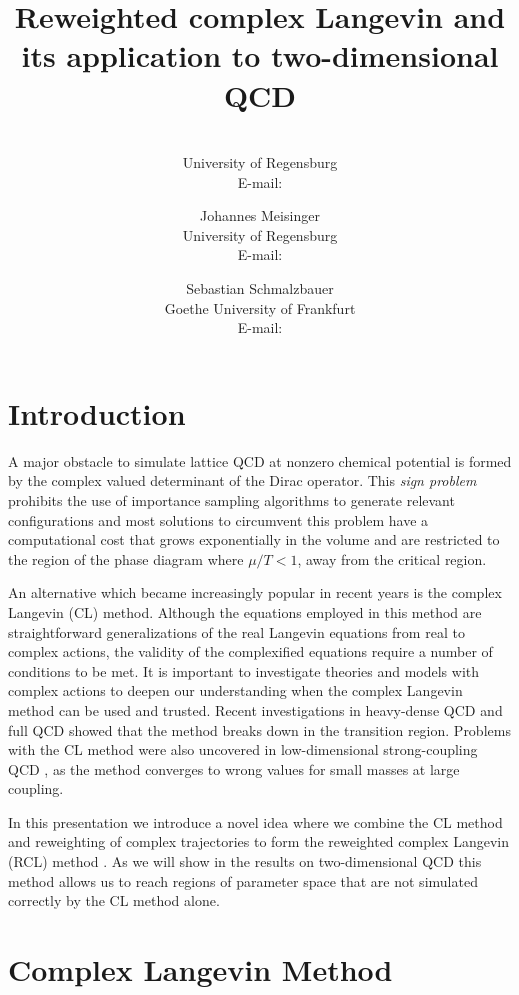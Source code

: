 \documentclass{PoS}
\title{Reweighted complex Langevin and its application to two-dimensional QCD}
\author{\speaker{Jacques Bloch}\\
        University of Regensburg\\
        E-mail: \email{jacques.bloch@ur.de}}
\author{Johannes Meisinger\\
        University of Regensburg\\
        E-mail: \email{johannes.meisinger@ur.de}}
\author{Sebastian Schmalzbauer\\
        Goethe University of Frankfurt \\
        E-mail: \email{schmalzbauer@th.physik.uni-frankfurt.de}}
\begin{document}
\section{Introduction}

A major obstacle to simulate lattice QCD at nonzero chemical potential is formed by the complex valued determinant of the Dirac operator. This \emph{sign problem} prohibits the use of importance sampling algorithms to generate relevant configurations and most solutions to circumvent this problem have a computational cost that grows exponentially in the volume and are restricted to the region of the phase diagram where $\mu/T<1$, away from the critical region.

An alternative which became increasingly popular in recent years is the complex Langevin (CL) method. Although the equations employed in this method are straightforward generalizations of the real Langevin equations from real to complex actions, the validity of the complexified equations require a number of conditions to be met.
It is important to investigate theories and models with complex actions to deepen our understanding when the complex Langevin method can be used and trusted. Recent investigations in heavy-dense QCD \cite{Sexty:2013ica} and full QCD \cite{Fodor:2015doa} showed that the method breaks down in the transition region. Problems with the CL method were also uncovered in low-dimensional strong-coupling QCD \cite{Bloch:2015coa}, as the method converges to wrong values for small masses at large coupling.

In this presentation we introduce a novel idea where we combine the CL method and reweighting of complex trajectories to form the reweighted complex Langevin (RCL) method \cite{Bloch2016}. As we will show in the results on two-dimensional QCD this method allows us to reach regions of parameter space that are not simulated correctly by the CL method alone. 


\section{Complex Langevin Method}
\end{document}
